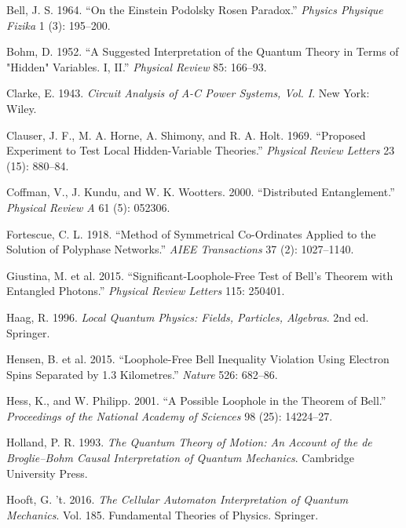 \documentclass[
  11pt]{article}
\newlength{\cslhangindent}
\newenvironment{CSLReferences}[2] %
 {\begin{list}{}{%
  \setlength{\itemindent}{0pt}
  \setlength{\leftmargin}{0pt}
  \setlength{\parsep}{0pt}
  \ifodd #1
   \setlength{\leftmargin}{\cslhangindent}
   \setlength{\itemindent}{-1\cslhangindent}
  \fi
  \setlength{\itemsep}{#2\baselineskip}}}
 {\end{list}}
\begin{document}
\label{refs}
\begin{CSLReferences}{1}{0}
Bell, J. S. 1964. {``On the {Einstein} {Podolsky} {Rosen} Paradox.''}
\emph{Physics Physique Fizika} 1 (3): 195--200.

Bohm, D. 1952. {``A Suggested Interpretation of the Quantum Theory in
Terms of "Hidden" Variables. {I}, {II}.''} \emph{Physical Review} 85:
166--93.

Clarke, E. 1943. \emph{Circuit Analysis of {A-C} Power Systems, Vol.
{I}}. New York: Wiley.

Clauser, J. F., M. A. Horne, A. Shimony, and R. A. Holt. 1969.
{``Proposed Experiment to Test Local Hidden-Variable Theories.''}
\emph{Physical Review Letters} 23 (15): 880--84.

Coffman, V., J. Kundu, and W. K. Wootters. 2000. {``Distributed
Entanglement.''} \emph{Physical Review A} 61 (5): 052306.

Fortescue, C. L. 1918. {``Method of Symmetrical Co-Ordinates Applied to
the Solution of Polyphase Networks.''} \emph{AIEE Transactions} 37 (2):
1027--1140.

Giustina, M. et al. 2015. {``Significant-Loophole-Free Test of {Bell's}
Theorem with Entangled Photons.''} \emph{Physical Review Letters} 115:
250401.

Haag, R. 1996. \emph{Local Quantum Physics: Fields, Particles,
Algebras}. 2nd ed. Springer.

Hensen, B. et al. 2015. {``Loophole-Free {Bell} Inequality Violation
Using Electron Spins Separated by 1.3 Kilometres.''} \emph{Nature} 526:
682--86.

Hess, K., and W. Philipp. 2001. {``A Possible Loophole in the Theorem of
{Bell}.''} \emph{Proceedings of the National Academy of Sciences} 98
(25): 14224--27.

Holland, P. R. 1993. \emph{The Quantum Theory of Motion: An Account of
the de {Broglie}--{Bohm} Causal Interpretation of Quantum Mechanics}.
Cambridge University Press.

Hooft, G. 't. 2016. \emph{The Cellular Automaton Interpretation of
Quantum Mechanics}. Vol. 185. Fundamental Theories of Physics. Springer.


\end{CSLReferences}
\end{document}
